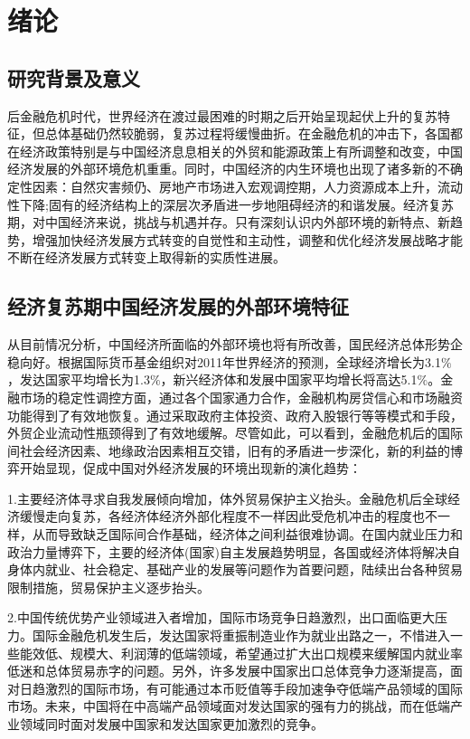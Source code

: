 \chapter{绪论}
\section{研究背景及意义}
后金融危机时代，世界经济在渡过最困难的时期之后开始呈现起伏上升的复苏特征，但总体基础仍然较脆弱，复苏过程将缓慢曲折。在金融危机的冲击下，各国都在经济政策特别是与中国经济息息相关的外贸和能源政策上有所调整和改变，中国经济发展的外部环境危机重重。同时，中国经济的内生环境也出现了诸多新的不确定性因素：自然灾害频仍、房地产市场进入宏观调控期，人力资源成本上升，流动性下降;固有的经济结构上的深层次矛盾进一步地阻碍经济的和谐发展。经济复苏期，对中国经济来说，挑战与机遇并存。只有深刻认识内外部环境的新特点、新趋势，增强加快经济发展方式转变的自觉性和主动性，调整和优化经济发展战略才能不断在经济发展方式转变上取得新的实质性进展。

\section{经济复苏期中国经济发展的外部环境特征}

从目前情况分析，中国经济所面临的外部环境也将有所改善，国民经济总体形势企稳向好。根据国际货币基金组织对2011年世界经济的预测，全球经济增长为3.1$\%$，发达国家平均增长为1.3$\%$，新兴经济体和发展中国家平均增长将高达5.1$\%$。金融市场的稳定性调控方面，通过各个国家通力合作，金融机构房贷信心和市场融资功能得到了有效地恢复。通过采取政府主体投资、政府入股银行等等模式和手段，外贸企业流动性瓶颈得到了有效地缓解。尽管如此，可以看到，金融危机后的国际间社会经济因素、地缘政治因素相互交错，旧有的矛盾进一步深化，新的利益的博弈开始显现，促成中国对外经济发展的环境出现新的演化趋势：

1.主要经济体寻求自我发展倾向增加，体外贸易保护主义抬头。金融危机后全球经济缓慢走向复苏，各经济体经济外部化程度不一样因此受危机冲击的程度也不一样，从而导致缺乏国际间合作基础，经济体之间利益很难协调。在国内就业压力和政治力量博弈下，主要的经济体(国家)自主发展趋势明显，各国或经济体将解决自身体内就业、社会稳定、基础产业的发展等问题作为首要问题，陆续出台各种贸易限制措施，贸易保护主义逐步抬头。

2.中国传统优势产业领域进入者增加，国际市场竞争日趋激烈，出口面临更大压力。国际金融危机发生后，发达国家将重振制造业作为就业出路之一，不惜进入一些能效低、规模大、利润薄的低端领域，希望通过扩大出口规模来缓解国内就业率低迷和总体贸易赤字的问题。另外，许多发展中国家出口总体竞争力逐渐提高，面对日趋激烈的国际市场，有可能通过本币贬值等手段加速争夺低端产品领域的国际市场。未来，中国将在中高端产品领域面对发达国家的强有力的挑战，而在低端产业领域同时面对发展中国家和发达国家更加激烈的竞争。

